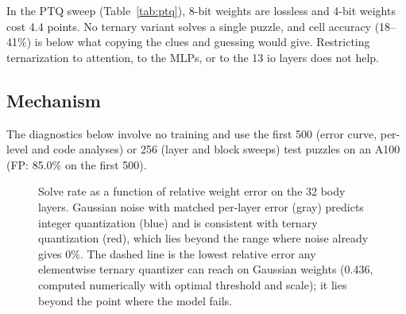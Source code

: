 \documentclass[11pt]{article}
\begin{document}
In the PTQ sweep (Table~\ref{tab:ptq}), 8-bit weights are lossless and 4-bit weights cost 4.4 points. No ternary
variant solves a single puzzle, and cell accuracy (18--41\%) is below what copying the clues and guessing would
give. Restricting ternarization to attention, to the MLPs, or to the 13 io layers does not help.

\subsection{Mechanism}
\label{sec:mechanism}

The diagnostics below involve no training and use the first 500 (error curve, per-level and code analyses) or 256
(layer and block sweeps) test puzzles on an A100
(FP: 85.0\% on the first 500).

\begin{figure}[t]
\centering
{}
\caption{Solve rate as a function of relative weight error on the 32 body layers. Gaussian noise with matched
per-layer error (gray) predicts integer quantization (blue) and is consistent with ternary quantization (red),
which lies beyond the range where noise already gives 0\%. The dashed line is the lowest relative error any
elementwise ternary quantizer can reach on Gaussian weights (0.436, computed numerically with optimal threshold
and scale); it lies beyond the point where the model fails.}
\label{fig:errcurve}
\end{figure}
\end{document}
